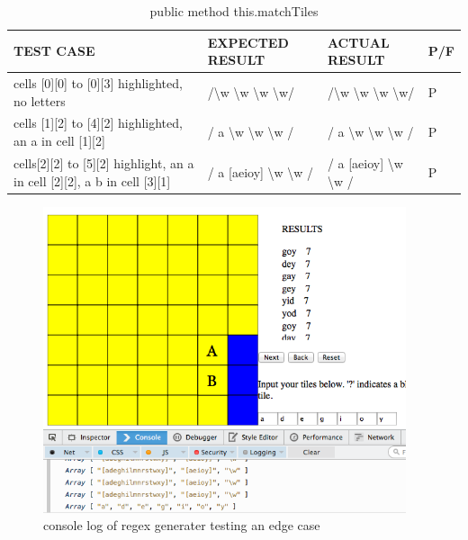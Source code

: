 \documentclass[11pt, oneside]{article}
\begin{document}
\begin{table}[hl]
\caption{public method this.matchTiles}
\begin{center}
\begin{tabular}{|p{}|p{}|p{}|p{}|}

\hline
\textbf{TEST CASE} & \textbf{EXPECTED RESULT} & \textbf{ACTUAL RESULT} & P/F \\
\hline
cells [0][0] to [0][3] highlighted, no letters & /\textbackslash w \textbackslash w \textbackslash w \textbackslash w/ & /\textbackslash w \textbackslash w \textbackslash w \textbackslash w/ & P \\
\hline
cells [1][2] to [4][2] highlighted, an a in cell [1][2] & / a \textbackslash w \textbackslash w \textbackslash w / & / a \textbackslash w \textbackslash w \textbackslash w / & P \\
\hline
cells[2][2] to [5][2] highlight, an a in cell [2][2], a b in cell [3][1] & / a [aeioy] \textbackslash w \textbackslash w / & / a [aeioy] \textbackslash w \textbackslash w / & P \\
\hline
\end{tabular}
\end{center}
\label{default}
\end{table}%

\begin{figure}[hl]
\caption{console log of regex generater testing an edge case}
\includegraphics[width=0.95\textwidth]{regex.png}
\end{figure}
\end{document}
